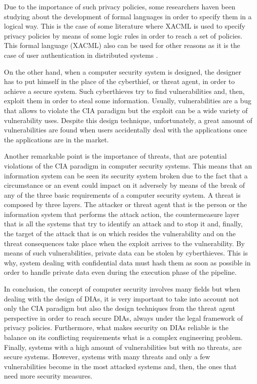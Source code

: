 Due to the importance of such privacy policies, some researchers haven been studying about the development of formal languages in order to specify them in a logical way. This is the case of some literature \cite{XACMLlanguage} where XACML is used to specify privacy policies by means of some logic rules in order to reach a set of policies. This formal language (XACML) also can be used for other reasons as it is the case of user authentication in distributed systems \cite{XACMLforAuthentication}.

On the other hand, when a computer security system is designed, the designer has to put himself in the place of the cyberthief, or threat agent, in order to achieve a secure system. Such cyberthieves try to find vulnerabilities and, then, exploit them in order to steal some information. Usually, vulnerabilities are a bug that allows to violate the CIA paradigm but the exploit can be a wide variety of vulnerability uses. Despite this design technique, unfortunately, a great amount of vulnerabilities are found when users accidentally deal with the applications once the applications are in the market.

Another remarkable point is the importance of threats, that are potential violations of the CIA paradigm in computer security systems. This means that an information system can be seen its security system broken due to the fact that a circumstance or an event could impact on it adversely by means of the break of any of the three basic requirements of a computer security system. A threat is composed by three layers. The attacker or threat agent that is the person or the information system that performs the attack action, the countermeasure layer that is all the systems that try to identify an attack and to stop it and, finally, the target of the attack that is on which resides the vulnerability and on the threat consequences take place when the exploit arrives to the vulnerability. By means  of such vulnerabilities, private data can be stolen by cyberthieves. This is why, system dealing with confidential data must hash them as soon as possible in order to handle private data even during the execution phase of the pipeline.

In conclusion, the concept of computer security involves many fields but when dealing with the design of DIAs, it is very important to take into account not only the CIA paradigm but also the design techniques from the threat agent perspective in order to reach secure DIAs, always under the legal framework of privacy policies. Furthermore, what makes security on DIAs reliable is the balance on its conflicting requirements what is a complex engineering problem. Finally, systems with a high amount of vulnerabilities but with no threats, are secure systems. However, systems with many threats and only a few vulnerabilities become in the most attacked systems and, then, the ones that need more security measures.

